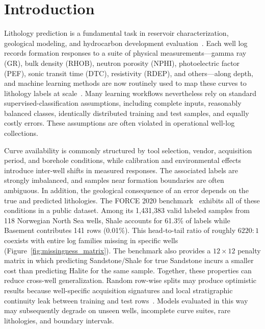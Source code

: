 \documentclass[bdcc,article,submit,pdftex,moreauthors]{Definitions/mdpi}
\begin{document}
\sloppy

\section{Introduction}
\label{sec:intro}
Lithology prediction is a fundamental task in reservoir characterization, geological
modeling, and hydrocarbon development evaluation~\cite{rider2011,ellis2007,doveton2014}. Each
well log records formation responses to a suite of physical measurements---gamma ray
(GR), bulk density (RHOB), neutron porosity (NPHI), photoelectric factor (PEF), sonic transit
time (DTC), resistivity (RDEP), and others---along depth, and machine learning methods are
now routinely used to map these curves to lithology labels at
scale~\cite{hall2016facies,merembayev2021,dev2019formation,carvalho2026benchmark}. Many
learning workflows nevertheless rely on standard supervised-classification assumptions, including
complete inputs, reasonably balanced classes, identically distributed training and test samples,
and equally costly errors. These assumptions are often violated in operational well-log
collections.

Curve availability is commonly structured by tool selection, vendor, acquisition period,
and borehole conditions, while calibration and environmental effects introduce inter-well
shifts in measured responses. The associated labels are strongly imbalanced, and samples
near formation boundaries are often ambiguous. In addition, the geological consequence of
an error depends on the true and predicted lithologies. The FORCE 2020
benchmark~\cite{bormann2020force} exhibits all of these conditions in a public
dataset. Among its 1{,}431{,}383 valid labeled samples from 118 Norwegian North Sea wells,
Shale accounts for 61.3\% of labels while Basement contributes 141 rows (0.01\%). This
head-to-tail ratio of roughly $6220{:}1$ coexists with entire log families missing in specific wells
(Figure~\ref{fig:missingness_matrix}). The benchmark also provides a
$12{\times}12$ penalty matrix in which predicting Sandstone/Shale for true Sandstone incurs
a smaller cost than predicting Halite for the same sample. Together, these properties can
reduce cross-well generalization. Random row-wise splits may produce optimistic results because
well-specific acquisition signatures and local stratigraphic continuity leak between training
and test rows~\cite{rosenblatt2024,roberts2017cv,mila2022nndm}. Models evaluated in this way
may subsequently degrade on unseen wells, incomplete curve suites, rare lithologies, and
boundary intervals.
\end{document}
